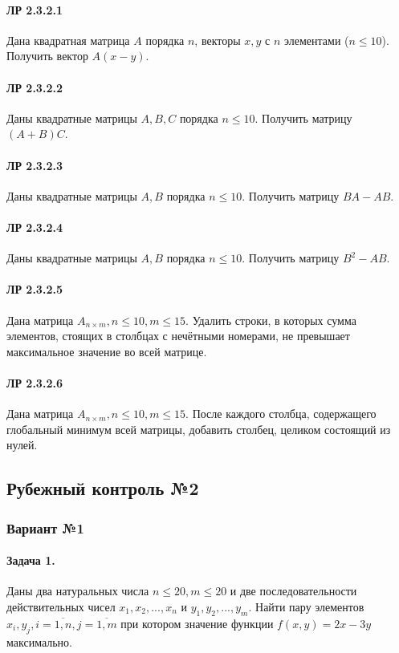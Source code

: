 \documentclass[12pt,a4paper]{report}
\begin{document}
\paragraph*{ЛР 2.3.2.1} Дана квадратная матрица $A$ порядка $n$, векторы $x, y$ с $n$ элементами ($n \le 10$). Получить вектор $A(x-y)$.
\paragraph*{ЛР 2.3.2.2} Даны квадратные матрицы $A, B, C$ порядка $n \le 10$. Получить матрицу $(A+B)C$.
\paragraph*{ЛР 2.3.2.3} Даны квадратные матрицы $A, B$ порядка $n \le 10$. Получить матрицу $BA-AB$.
\paragraph*{ЛР 2.3.2.4} Даны квадратные матрицы $A, B$ порядка $n \le 10$. Получить матрицу $B^2-AB$.
\paragraph*{ЛР 2.3.2.5} Дана матрица $A_{n \times m}, n \le 10, m \le 15$. Удалить строки, в которых сумма элементов, стоящих в столбцах с нечётными номерами, не превышает максимальное значение во всей матрице.
\paragraph*{ЛР 2.3.2.6} Дана матрица $A_{n \times m}, n \le 10, m \le 15$. После каждого столбца, содержащего глобальный минимум всей матрицы, добавить столбец, целиком состоящий из нулей.



\clearpage
\subsection*{Рубежный контроль №2}
\subsubsection*{Вариант №1}
\paragraph*{Задача 1.} Даны два натуральных числа $n \le 20, m \le 20$ и две последовательности действительных чисел $x_1, x_2, ..., x_n$ и $y_1, y_2, ..., y_m$. Найти пару элементов $x_i, y_j, i=\overline{1,n}, j=\overline{1,m}$ при котором значение функции $f(x, y) = 2 x - 3 y$ максимально.
\end{document}
